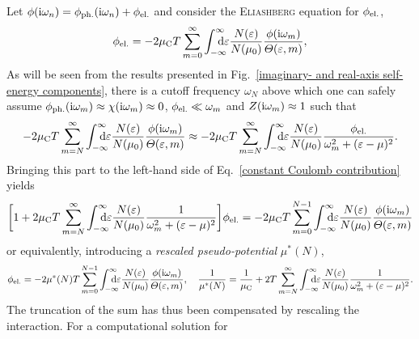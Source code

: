 Let $\phi(\mathrm i \omega_n) = \phi \sb{\text{ph.}} (\mathrm i \omega_n) + \phi \sb{\text{el.}}$ and
consider the \textsc{Eliashberg} equation for $\phi \sb{\text{el.}}$,
%
\begin{equation} \label{constant Coulomb contribution}
    \phi \sub{el.} = -2 \mu \sub C T \sum_{m = 0}^\infty
    \int \from{-\infty} \till \infty \D \epsilon
    \frac{N(\epsilon)}{N(\mu_0)}
    \frac{\phi(\I \omega_m)}{\Theta(\epsilon, m)},
\end{equation}
%
As will be seen from the results presented in Fig.~\ref{imaginary- and real-axis
self-energy components}, there is a cutoff frequency $\omega_N$ above which one
can safely assume $\phi \sb{\text{ph.}} (\mathrm i \omega_m) \approx \chi(\mathrm i \omega_m)
\approx 0$, $\phi \sb{\text{el.}} \ll \omega_m$ and $Z(\mathrm i \omega_m) \approx 1$ such
that
%
\begin{equation*}
    -2 \mu \sub C T \sum_{m = N}^\infty
    \int \from{-\infty} \till \infty \D \epsilon
    \frac{N(\epsilon)}{N(\mu_0)}
    \frac{\phi(\I \omega_m)}{\Theta(\epsilon, m)}
    \approx -2 \mu \sub C T \sum_{m = N}^\infty
    \int \from{-\infty} \till \infty \D \epsilon
    \frac{N(\epsilon)}{N(\mu_0)}
    \frac{\phi \sub{el.}}{\omega_m^2 + (\epsilon - \mu)^2}.
\end{equation*}
%
Bringing this part to the left-hand side of Eq.~\ref{constant Coulomb
contribution} yields
%
\begin{equation*}
    \bigg[
        1 + 2 \mu \sub C T \sum_{m = N}^\infty
        \int \from{-\infty} \till \infty \D \epsilon
        \frac{N(\epsilon)}{N(\mu_0)}
        \frac 1 {\omega_m^2 + (\epsilon - \mu)^2}
    \bigg]
    \phi \sub{el.} =
    -2 \mu \sub C T \sum_{m = 0}^{N - 1}
    \int \from{-\infty} \till \infty \D \epsilon
    \frac{N(\epsilon)}{N(\mu_0)}
    \frac{\phi(\I \omega_m)}{\Theta(\epsilon, m)}
\end{equation*}
%
or equivalently, introducing a \emph{rescaled  pseudo-potential}
$\mu^*(N)$,
%
\begin{equation*}
    \phi \sub{el.} =
    -2 \mu^*(N) T \sum_{m = 0}^{N - 1}
    \int \from{-\infty} \till \infty \D \epsilon
    \frac{N(\epsilon)}{N(\mu_0)}
    \frac{\phi(\I \omega_m)}{\Theta(\epsilon, m)},
    \quad
    \frac 1 {\mu^*(N)} = \frac 1 {\mu \sub C}
    + 2 T \sum_{m = N}^\infty
    \int \from{-\infty} \till \infty \D \epsilon
    \frac{N(\epsilon)}{N(\mu_0)}
    \frac 1 {\omega_m^2 + (\epsilon - \mu)^2}.
\end{equation*}
%
The truncation of the  sum has thus been compensated by
rescaling the  interaction. For a computational solution for
